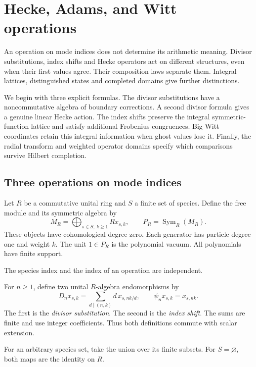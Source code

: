 \chapter{Hecke, Adams, and Witt operations}
\label{v4-arith:hecke:chapter}

An operation on mode indices does not determine its arithmetic meaning.
Divisor substitutions, index shifts and Hecke operators act on
different structures, even when their first values agree.
Their composition laws separate them. Integral lattices, distinguished
states and completed domains give further distinctions.

We begin with three explicit formulas. The divisor substitutions have
a noncommutative algebra of boundary corrections. A second divisor
formula gives a genuine linear Hecke action. The index shifts preserve
the integral symmetric-function lattice and satisfy additional Frobenius congruences.
Big Witt coordinates retain this integral information when ghost values
lose it. Finally, the radial transform and weighted operator domains
specify which comparisons survive Hilbert completion.

\section{Three operations on mode indices}
\label{v4-arith:hecke:sec:three}

Let $R$ be a commutative unital ring and $S$ a finite set of species.
Define the free module and its symmetric algebra by
\[
 M_R=\bigoplus_{s\in S,\ k\geq1}R x_{s,k},\qquad
 P_R=\operatorname{Sym}_R(M_R).
\]
These objects have cohomological degree zero. Each generator has
particle degree one and weight $k$.
The unit $1\in P_R$ is the
polynomial vacuum. All polynomials have finite support.

The species index and the index of an operation are independent.

For $n\geq1$, define two unital $R$-algebra endomorphisms by
\begin{equation}
 \label{v4-arith:hecke:eq:substitutions}
 D_nx_{s,k}=\sum_{d\mid(n,k)}d\,x_{s,nk/d},\qquad
 \psi_nx_{s,k}=x_{s,nk}.
\end{equation}
The first is the \emph{divisor substitution}. The second is the
\emph{index shift}. The sums are finite and use integer coefficients.
Thus both definitions commute with scalar extension.

For an arbitrary species set, take the union over its finite subsets.
For $S=\varnothing$, both maps are the identity on $R$.

